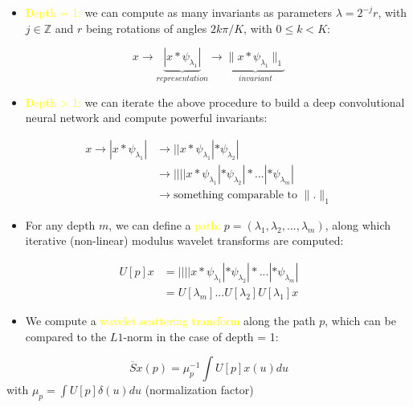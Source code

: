 \documentclass[10pt]{beamer}
\newcommand{\mathZ}{\mathbb{Z}}
\newcommand{\col}{\textcolor{yellow}}
\begin{document}
\begin{darkframes}
    \begin{frame}[label=build]{\subsecname}
    \begin{itemize}
        \item \col{Depth = 1:} we can compute as many invariants as parameters $\lambda = 2^{-j}r$, with $j \in \mathZ$ and $r$ being rotations of angles $2k\pi/K$, with $0 \leq k < K$:
    \end{itemize}
    $$x \longrightarrow \underbrace{|x \ast \psi_{\lambda_1}|}_{representation} \longrightarrow \underbrace{\|x \ast \psi_{\lambda_1}\|_1}_{invariant}$$
    \begin{itemize}
        \item \col{Depth > 1:} we can iterate the above procedure to build a deep convolutional neural network and compute powerful invariants:
    \end{itemize}
    \begin{equation}
    \begin{split}
        x \longrightarrow |x \ast \psi_{\lambda_1}|
            & \longrightarrow ||x \ast \psi_{\lambda_1}| \ast \psi_{\lambda_2}| \\
            & \longrightarrow ||||x \ast \psi_{\lambda_1}| \ast \psi_{\lambda_2}| \ast ...| \ast \psi_{\lambda_m}| \\
            & \longrightarrow \mbox{something comparable to } \|.\|_1
    \end{split}
    \end{equation}
    \end{frame}
    
    \begin{frame}[label=build]{\subsecname}
    \begin{itemize}
        \item For any depth $m$, we can define a \col{path:} $p = (\lambda_1, \lambda_2, ..., \lambda_m)$, along which iterative (non-linear) modulus wavelet transforms are computed:
    \end{itemize}
    \begin{equation}
    \begin{split}
        U[p]x
            & = ||||x \ast \psi_{\lambda_1}| \ast \psi_{\lambda_2}| \ast ...| \ast \psi_{\lambda_m}| \\
            & = U[\lambda_m] ... U[\lambda_2] U[\lambda_1] x
    \end{split}
    \end{equation}
    \begin{itemize}
        \item We compute a \col{wavelet scattering transform} along the path $p$, which can be compared to the $L1$-norm in the case of depth = 1:
    \end{itemize}
    $$\overline{S}x(p) = \mu_p^{-1} \int U[p]x(u) du$$
    with $\mu_p = \int U[p] \delta(u) du$ (normalization factor)
    \end{frame}
    

\end{darkframes}
\end{document}
